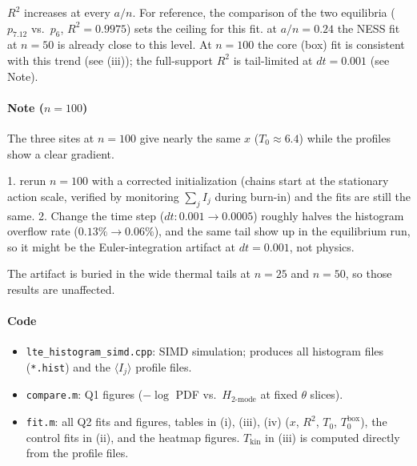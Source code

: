 \documentclass[11pt]{article}
\begin{document}
$R^2$ increases at every $a/n$. For reference, the comparison of the two equilibria ($p_{7.12}$ vs.\ $p_6$, $R^2 = 0.9975$)
sets the ceiling for this fit. at $a/n = 0.24$ the NESS fit at $n=50$ is
already close to this level. At $n=100$ the core (box) fit is consistent with this trend (see (iii)); the full-support $R^2$ is tail-limited at $dt=0.001$ (see Note).

\paragraph{Note ($n=100$)}
The three sites at $n=100$ give nearly the same $x$ ($T_0 \approx 6.4$) while the profiles show a clear gradient. 

1. rerun $n=100$ with a
corrected initialization (chains start at the stationary action scale,
verified by monitoring $\sum_j I_j$ during burn-in) and the fits are still the same. 2. Change the time
step ($dt: 0.001 \to 0.0005$) roughly halves the histogram overflow rate
($0.13\% \to 0.06\%$), and the same tail show up in the equilibrium
run, so it might be the Euler-integration
artifact at $dt = 0.001$, not physics.

The artifact is buried in the wide thermal tails at $n=25$
and $n=50$, so those results are unaffected. 

\paragraph{Code}
\begin{itemize}
\item \texttt{lte\_histogram\_simd.cpp}: SIMD simulation; produces all
histogram files (\texttt{*.hist}) and the $\langle I_j\rangle$ profile files.
\item \texttt{compare.m}: Q1 figures ($-\log$ PDF vs.\ $H_{\text{2-mode}}$
at fixed $\theta$ slices).
\item \texttt{fit.m}: all Q2 fits and figures, tables in
(i), (iii), (iv) ($x$, $R^2$, $T_0$, $T_0^{\mathrm{box}}$), the control fits
in (ii), and the heatmap figures. $T_{\mathrm{kin}}$ in (iii) is computed
directly from the profile files.
\end{itemize}
\end{document}
